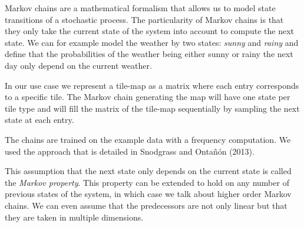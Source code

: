 \documentclass[A4paper,]{article}
\begin{document}
Markov chains are a mathematical formalism that allows us to model state
transitions of a stochastic process. The particularity of Markov chains
is that they only take the current state of the system into account to
compute the next state. We can for example model the weather by two
states: \emph{sunny} and \emph{rainy} and define that the probabilities
of the weather being either sunny or rainy the next day only depend on
the current weather.

In our use case we represent a tile-map as a matrix where each entry
corresponds to a specific tile. The Markov chain generating the map will
have one state per tile type and will fill the matrix of the tile-map
sequentially by sampling the next state at each entry.

The chains are trained on the example data with a frequency computation.
We used the approach that is detailed in Snodgrass and Ontañón (2013).

This assumption that the next state only depends on the current state is
called the \emph{Markov property}. This property can be extended to hold
on any number of previous states of the system, in which case we talk
about higher order Markov chains. We can even assume that the
predecessors are not only linear but that they are taken in multiple
dimensions.
\end{document}
